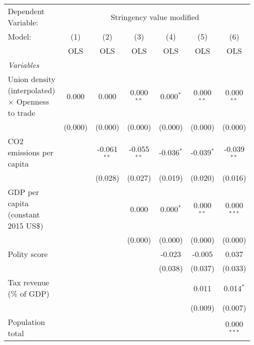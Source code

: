 
\begingroup
\centering
\begin{tabular}{lcccccc}
   \toprule
   Dependent Variable: & \multicolumn{6}{c}{Stringency value modified}\\
   Model:                                                   & (1)     & (2)           & (3)           & (4)          & (5)          & (6)\\  
                                                            &  OLS    & OLS           & OLS           & OLS          & OLS          & OLS\\  
   \midrule
   \emph{Variables}\\
   Union density (interpolated) $\times$ Openness to trade  & 0.000   & 0.000         & 0.000$^{**}$  & 0.000$^{*}$  & 0.000$^{**}$ & 0.000$^{**}$\\   
                                                            & (0.000) & (0.000)       & (0.000)       & (0.000)      & (0.000)      & (0.000)\\   
   CO2 emissions per capita                                 &         & -0.061$^{**}$ & -0.055$^{**}$ & -0.036$^{*}$ & -0.039$^{*}$ & -0.039$^{**}$\\   
                                                            &         & (0.028)       & (0.027)       & (0.019)      & (0.020)      & (0.016)\\   
   GDP per capita (constant 2015 US\$)                      &         &               & 0.000         & 0.000$^{*}$  & 0.000$^{**}$ & 0.000$^{***}$\\   
                                                            &         &               & (0.000)       & (0.000)      & (0.000)      & (0.000)\\   
   Polity score                                             &         &               &               & -0.023       & -0.005       & 0.037\\   
                                                            &         &               &               & (0.038)      & (0.037)      & (0.033)\\   
   Tax revenue (\% of GDP)                                  &         &               &               &              & 0.011        & 0.014$^{*}$\\   
                                                            &         &               &               &              & (0.009)      & (0.007)\\   
   Population total                                         &         &               &               &              &              & 0.000$^{***}$\\   

\end{tabular}
